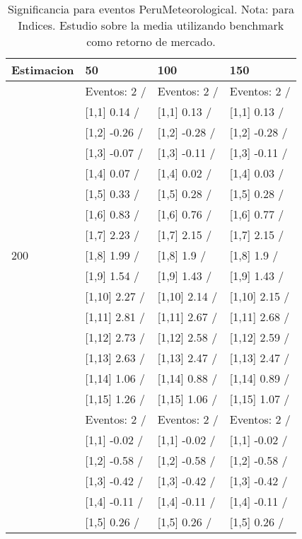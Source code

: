\begin{table}

\caption{Significancia para eventos PeruMeteorological. Nota: para Indices. Estudio sobre la media utilizando benchmark como retorno de mercado.}
\centering
\begin{tabular}[t]{llll}
\toprule
Estimacion & 50 & 100 & 150\\
\midrule
 & Eventos:  2 / & Eventos:  2 / & Eventos:  2 /\\
 & {}[1,1] 0.14  / & {}[1,1] 0.13  / & {}[1,1] 0.13  /\\
 & {}[1,2] -0.26  / & {}[1,2] -0.28  / & {}[1,2] -0.28  /\\
 & {}[1,3] -0.07  / & {}[1,3] -0.11  / & {}[1,3] -0.11  /\\
 & {}[1,4] 0.07  / & {}[1,4] 0.02  / & {}[1,4] 0.03  /\\
\addlinespace
 & {}[1,5] 0.33  / & {}[1,5] 0.28  / & {}[1,5] 0.28  /\\
 & {}[1,6] 0.83  / & {}[1,6] 0.76  / & {}[1,6] 0.77  /\\
 & {}[1,7] 2.23  / & {}[1,7] 2.15  / & {}[1,7] 2.15  /\\
200 & {}[1,8] 1.99  / & {}[1,8] 1.9  / & {}[1,8] 1.9  /\\
 & {}[1,9] 1.54  / & {}[1,9] 1.43  / & {}[1,9] 1.43  /\\
\addlinespace
 & {}[1,10] 2.27  / & {}[1,10] 2.14  / & {}[1,10] 2.15  /\\
 & {}[1,11] 2.81  / & {}[1,11] 2.67  / & {}[1,11] 2.68  /\\
 & {}[1,12] 2.73  / & {}[1,12] 2.58  / & {}[1,12] 2.59  /\\
 & {}[1,13] 2.63  / & {}[1,13] 2.47  / & {}[1,13] 2.47  /\\
 & {}[1,14] 1.06  / & {}[1,14] 0.88  / & {}[1,14] 0.89  /\\
\addlinespace
 & {}[1,15] 1.26  / & {}[1,15] 1.06  / & {}[1,15] 1.07  /\\
 & Eventos:  2 / & Eventos:  2 / & Eventos:  2 /\\
 & {}[1,1] -0.02  / & {}[1,1] -0.02  / & {}[1,1] -0.02  /\\
 & {}[1,2] -0.58  / & {}[1,2] -0.58  / & {}[1,2] -0.58  /\\
 & {}[1,3] -0.42  / & {}[1,3] -0.42  / & {}[1,3] -0.42  /\\
\addlinespace
 & {}[1,4] -0.11  / & {}[1,4] -0.11  / & {}[1,4] -0.11  /\\
 & {}[1,5] 0.26  / & {}[1,5] 0.26  / & {}[1,5] 0.26  /\\

\end{tabular}
\end{table}
